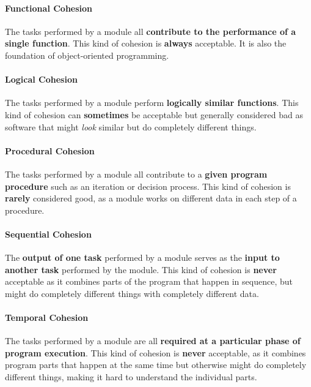 \paragraph{Functional Cohesion} %
\label{par:paragraph_name}
The tasks performed by a module all \textbf{contribute to the performance of a single function}.
This kind of cohesion is \textbf{always} acceptable. It is also the foundation of object-oriented programming.

\paragraph{Logical Cohesion} %
\label{par:logical_cohesion}
The tasks performed by a module perform \textbf{logically similar functions}.
This kind of cohesion can \textbf{sometimes} be acceptable but generally considered bad as software that might \emph{look} similar but do completely different things.

\paragraph{Procedural Cohesion} %
\label{par:procedural_cohesion}
The tasks performed by a module all contribute to a \textbf{given program procedure} such as an iteration or decision process.
This kind of cohesion is \textbf{rarely} considered good, as a module works on different data in each step of a procedure.

\paragraph{Sequential Cohesion} %
\label{par:sequential_cohesion}
The \textbf{output of one task} performed by a module serves as the \textbf{input to another task} performed by the module.
This kind of cohesion is \textbf{never} acceptable as it combines parts of the program that happen in sequence, but might do completely different things with completely different data.

\paragraph{Temporal Cohesion} %
\label{par:temporal_cohesion}
The tasks performed by a module are all \textbf{required at a particular phase of program execution}.
This kind of cohesion is \textbf{never} acceptable, as it combines program parts that happen at the same time but otherwise might do completely different things, making it hard to understand the individual parts.

